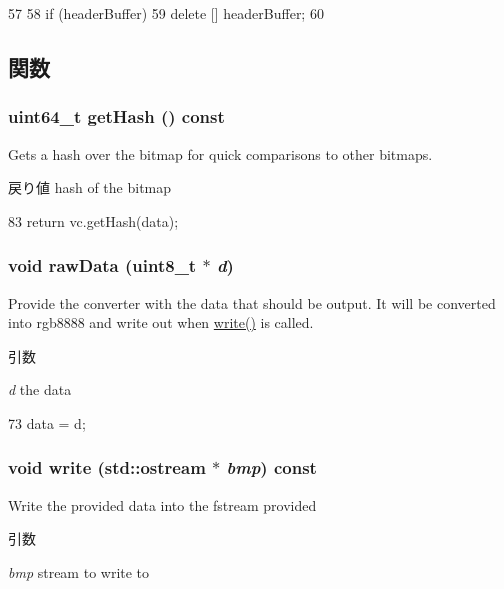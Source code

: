 \begin{DoxyCode}
57                 {
58     if (headerBuffer)
59         delete [] headerBuffer;
60 }
\end{DoxyCode}


\subsection{関数}
\hypertarget{classBitmap_a3ef96fae93207d460641b50add069399}{
\subsubsection[{getHash}]{\setlength{\rightskip}{0pt plus 5cm}uint64\_\-t getHash () const}}
\label{classBitmap_a3ef96fae93207d460641b50add069399}
Gets a hash over the bitmap for quick comparisons to other bitmaps. \begin{DoxyReturn}{戻り値}
hash of the bitmap 
\end{DoxyReturn}



\begin{DoxyCode}
83 { return vc.getHash(data); }
\end{DoxyCode}
\hypertarget{classBitmap_a22136d203fcf8657490b1844688596c4}{
\subsubsection[{rawData}]{\setlength{\rightskip}{0pt plus 5cm}void rawData (uint8\_\-t $\ast$ {\em d})}}
\label{classBitmap_a22136d203fcf8657490b1844688596c4}
Provide the converter with the data that should be output. It will be converted into rgb8888 and write out when \hyperlink{classBitmap_a45a62e70b01ae32e2815ab26cc8219f5}{write()} is called. 
\begin{DoxyParams}{引数}
\item[{\em d}]the data \end{DoxyParams}



\begin{DoxyCode}
73 { data = d; }
\end{DoxyCode}
\hypertarget{classBitmap_a45a62e70b01ae32e2815ab26cc8219f5}{
\subsubsection[{write}]{\setlength{\rightskip}{0pt plus 5cm}void write (std::ostream $\ast$ {\em bmp}) const}}
\label{classBitmap_a45a62e70b01ae32e2815ab26cc8219f5}
Write the provided data into the fstream provided 
\begin{DoxyParams}{引数}
\item[{\em bmp}]stream to write to \end{DoxyParams}



